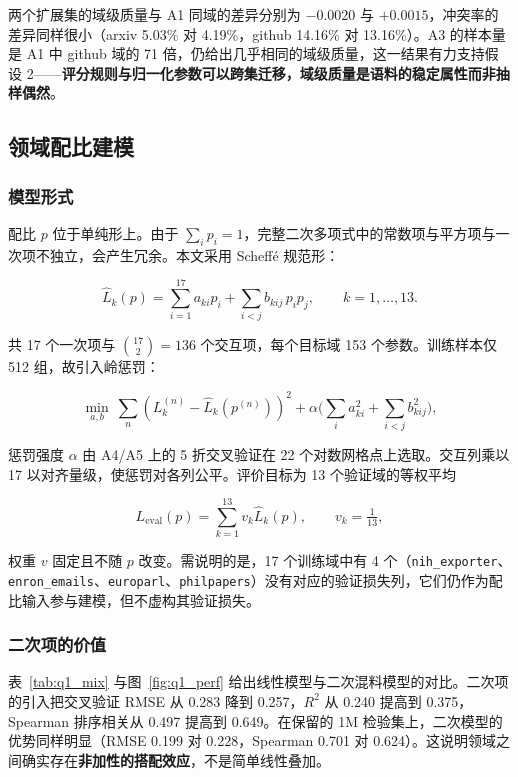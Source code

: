 两个扩展集的域级质量与 A1 同域的差异分别为 $-0.0020$ 与 $+0.0015$，冲突率的差异同样很小（arxiv 5.03\% 对 4.19\%，github 14.16\% 对 13.16\%）。A3 的样本量是 A1 中 github 域的 71 倍，仍给出几乎相同的域级质量，这一结果有力支持假设 2——\textbf{评分规则与归一化参数可以跨集迁移，域级质量是语料的稳定属性而非抽样偶然}。

\subsection{领域配比建模}

\subsubsection{模型形式}

配比 $p$ 位于单纯形上。由于 $\sum_i p_i=1$，完整二次多项式中的常数项与平方项与一次项不独立，会产生冗余。本文采用 Scheffé 规范形：

\begin{equation}
\widehat{L}_k(p)=\sum_{i=1}^{17}a_{ki}p_i+\sum_{i<j}b_{kij}\,p_ip_j,
\qquad k=1,\dots,13 .
\label{eq:mixture}
\end{equation}

共 17 个一次项与 $\binom{17}{2}=136$ 个交互项，每个目标域 153 个参数。训练样本仅 512 组，故引入岭惩罚：

\begin{equation}
\min_{a,b}\ \sum_{n}\left(L_{k}^{(n)}-\widehat{L}_k(p^{(n)})\right)^2
+\alpha\Big(\sum_i a_{ki}^2+\sum_{i<j}b_{kij}^2\Big),
\end{equation}

惩罚强度 $\alpha$ 由 A4/A5 上的 5 折交叉验证在 22 个对数网格点上选取。交互列乘以 17 以对齐量级，使惩罚对各列公平。评价目标为 13 个验证域的等权平均

\begin{equation}
L_{\mathrm{eval}}(p)=\sum_{k=1}^{13}v_k\widehat{L}_k(p),\qquad v_k=\tfrac{1}{13},
\end{equation}

权重 $v$ 固定且不随 $p$ 改变。需说明的是，17 个训练域中有 4 个（\texttt{nih\_exporter}、\texttt{enron\_emails}、\texttt{europarl}、\texttt{philpapers}）没有对应的验证损失列，它们仍作为配比输入参与建模，但不虚构其验证损失。

\subsubsection{二次项的价值}

表~\ref{tab:q1_mix} 与图~\ref{fig:q1_perf} 给出线性模型与二次混料模型的对比。二次项的引入把交叉验证 RMSE 从 0.283 降到 0.257，$R^2$ 从 0.240 提高到 0.375，Spearman 排序相关从 0.497 提高到 0.649。在保留的 1M 检验集上，二次模型的优势同样明显（RMSE 0.199 对 0.228，Spearman 0.701 对 0.624）。这说明领域之间确实存在\textbf{非加性的搭配效应}，不是简单线性叠加。

